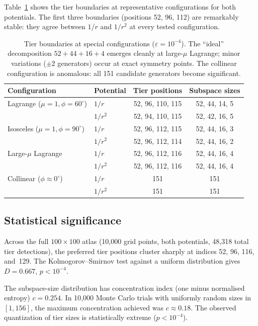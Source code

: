 \documentclass[11pt,a4paper]{article}
\theoremstyle{remark}
\begin{document}
Table~\ref{tab:tier-configs} shows the tier boundaries at
representative configurations for both potentials.  The
first three boundaries (positions 52, 96, 112) are
remarkably stable: they agree between $1/r$ and $1/r^2$
at every tested configuration.

\begin{table}[ht]
\centering
\small
\begin{tabular}{@{}llcc@{}}
\toprule
Configuration & Potential & Tier positions & Subspace sizes \\
\midrule
Lagrange ($\mu{=}1, \phi{=}60^\circ$)
  & $1/r$   & 52, 96, 110, 115 & 52, 44, 14, 5 \\
  & $1/r^2$ & 52, 94, 110, 115 & 52, 42, 16, 5 \\[3pt]
Isosceles ($\mu{=}1, \phi{=}90^\circ$)
  & $1/r$   & 52, 96, 112, 115 & 52, 44, 16, 3 \\
  & $1/r^2$ & 52, 96, 112, 114 & 52, 44, 16, 2 \\[3pt]
Large-$\mu$ Lagrange
  & $1/r$   & 52, 96, 112, 116 & 52, 44, 16, 4 \\
  & $1/r^2$ & 52, 96, 112, 116 & 52, 44, 16, 4 \\[3pt]
Collinear ($\phi \approx 0^\circ$)
  & $1/r$   & 151 & 151 \\
  & $1/r^2$ & 151 & 151 \\
\bottomrule
\end{tabular}
\caption{Tier boundaries at special configurations
  ($\varepsilon = 10^{-4}$).  The ``ideal'' decomposition
  $52 + 44 + 16 + 4$ emerges cleanly at large-$\mu$
  Lagrange; minor variations ($\pm 2$ generators) occur
  at exact symmetry points.  The collinear configuration
  is anomalous: all 151 candidate generators become
  significant.}
\label{tab:tier-configs}
\end{table}

\subsection{Statistical significance}

Across the full $100 \times 100$ atlas (10{,}000 grid
points, both potentials, 48{,}318 total tier detections),
the preferred tier positions cluster sharply at indices
52, 96, 116, and~129.  The Kolmogorov--Smirnov test
against a uniform distribution gives $D = 0.667$,
$p < 10^{-4}$.

The subspace-size distribution has concentration index
(one minus normalised entropy) $c = 0.254$.  In
10{,}000 Monte Carlo trials with uniformly random sizes
in $[1, 156]$, the maximum concentration achieved was
$c \approx 0.18$.  The observed quantization of tier
sizes is statistically extreme ($p < 10^{-4}$).
\end{document}
